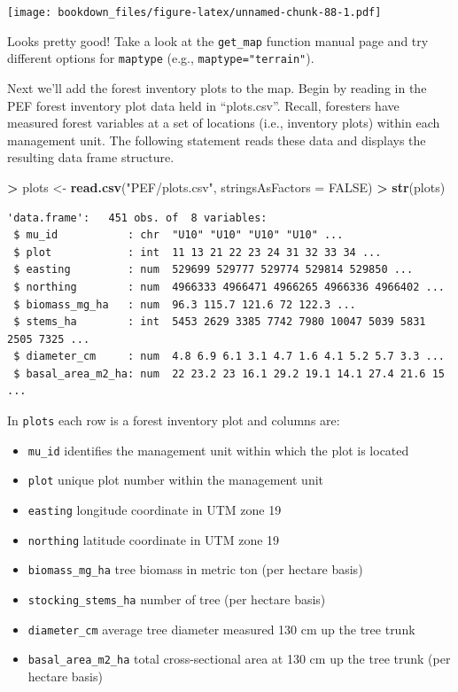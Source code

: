 \documentclass[]{krantz}
\makeatletter
\newenvironment{Shaded}{\begin{snugshade}}{\end{snugshade}}
\newcommand{\DataTypeTok}[1]{\textcolor[rgb]{0.27,0.27,0.27}{#1}}
\newcommand{\KeywordTok}[1]{\textcolor[rgb]{0.27,0.27,0.27}{\textbf{#1}}}
\newcommand{\NormalTok}[1]{#1}
\newcommand{\OperatorTok}[1]{\textcolor[rgb]{0.43,0.43,0.43}{\textbf{#1}}}
\newcommand{\OtherTok}[1]{\textcolor[rgb]{0.37,0.37,0.37}{#1}}
\newcommand{\StringTok}[1]{\textcolor[rgb]{0.5,0.5,0.5}{#1}}
\providecommand{\tightlist}{%
  \setlength{\itemsep}{0pt}\setlength{\parskip}{0pt}}
\newenvironment{kframe}{%
\medskip{}
\setlength{\fboxsep}{.8em}
 \def\at@end@of@kframe{}%
 \ifinner\ifhmode%
  \def\at@end@of@kframe{\end{minipage}}%
  \begin{minipage}{\columnwidth}%
 \fi\fi%
 \def\FrameCommand##1{\hskip\@totalleftmargin \hskip-\fboxsep
 \colorbox{shadecolor}{##1}\hskip-\fboxsep
     \hskip-\linewidth \hskip-\@totalleftmargin \hskip\columnwidth}%
 \MakeFramed {\advance\hsize-\width
   \@totalleftmargin\z@ \linewidth\hsize
   \@setminipage}}%
 {\par\unskip\endMakeFramed%
 \at@end@of@kframe}
\renewenvironment{Shaded}{\begin{kframe}}{\end{kframe}}
\makeatother
\begin{document}
\texttt{[image: bookdown\_files/figure-latex/unnamed-chunk-88-1.pdf]}

Looks pretty good! Take a look at the \texttt{get\_map} function manual page and try different options for \texttt{maptype} (e.g., \texttt{maptype="terrain"}).

Next we'll add the forest inventory plots to the map. Begin by reading in the PEF forest inventory plot data held in ``plots.csv''. Recall, foresters have measured forest variables at a set of locations (i.e., inventory plots) within each management unit. The following statement reads these data and displays the resulting data frame structure.

\begin{Shaded}
\begin{Highlighting}[]
\OperatorTok{>}\StringTok{ }\NormalTok{plots <-}\StringTok{ }\KeywordTok{read.csv}\NormalTok{(}\StringTok{"PEF/plots.csv"}\NormalTok{, }\DataTypeTok{stringsAsFactors =} \OtherTok{FALSE}\NormalTok{)}
\OperatorTok{>}\StringTok{ }\KeywordTok{str}\NormalTok{(plots)}
\end{Highlighting}
\end{Shaded}

\begin{verbatim}
'data.frame':   451 obs. of  8 variables:
 $ mu_id           : chr  "U10" "U10" "U10" "U10" ...
 $ plot            : int  11 13 21 22 23 24 31 32 33 34 ...
 $ easting         : num  529699 529777 529774 529814 529850 ...
 $ northing        : num  4966333 4966471 4966265 4966336 4966402 ...
 $ biomass_mg_ha   : num  96.3 115.7 121.6 72 122.3 ...
 $ stems_ha        : int  5453 2629 3385 7742 7980 10047 5039 5831 2505 7325 ...
 $ diameter_cm     : num  4.8 6.9 6.1 3.1 4.7 1.6 4.1 5.2 5.7 3.3 ...
 $ basal_area_m2_ha: num  22 23.2 23 16.1 29.2 19.1 14.1 27.4 21.6 15 ...
\end{verbatim}

In \texttt{plots} each row is a forest inventory plot and columns are:

\begin{itemize}
\tightlist
\item
  \texttt{mu\_id} identifies the management unit within which the plot is located
\item
  \texttt{plot} unique plot number within the management unit
\item
  \texttt{easting} longitude coordinate in UTM zone 19
\item
  \texttt{northing} latitude coordinate in UTM zone 19
\item
  \texttt{biomass\_mg\_ha} tree biomass in metric ton (per hectare basis)
\item
  \texttt{stocking\_stems\_ha} number of tree (per hectare basis)
\item
  \texttt{diameter\_cm} average tree diameter measured 130 cm up the tree trunk
\item
  \texttt{basal\_area\_m2\_ha} total cross-sectional area at 130 cm up the tree trunk (per hectare basis)
\end{itemize}
\end{document}
